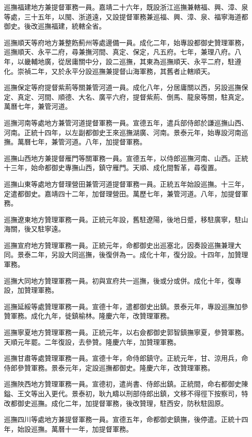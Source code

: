 巡撫福建地方兼提督軍務一員。嘉靖二十六年，既設浙江巡撫兼轄福、興、漳、泉等處，三十五年，以閩、浙道遠，又設提督軍務兼巡福、興、漳、泉、福寧海道都御史。後改巡撫福建，統轄全省。

巡撫順天等府地方兼整飭薊州等處邊備一員。成化二年，始專設都御史贊理軍務，巡撫順天、永平二府，尋兼撫河間、真定、保定，凡五府。七年，兼理八府。八年，以畿輔地廣，從居庸關中分，設二巡撫，其東為巡撫順天、永平二府，駐遵化。崇禎二年，又於永平分設巡撫兼提督山海軍務，其舊者止轄順天。

巡撫保定等府提督紫荊等關兼管河道一員。成化八年，分居庸關以西，另設巡撫保定、真定、河間、順德、大名、廣平六府，提督紫荊、倒馬、龍泉等關，駐真定。萬曆七年，兼管河道。

巡撫河南等處地方兼管河道提督軍務一員。宣德五年，遣兵部侍郎於謙巡撫山西、河南。正統十四年，以左副都御史王來巡撫湖廣、河南。景泰元年，始專設河南巡撫。萬曆七年，兼管河道。八年，加提督軍務。

巡撫山西地方兼提督雁門等關軍務一員。宣德五年，以侍郎巡撫河南、山西。正統十三年，始命都御史專撫山西，鎮守雁門。天順、成化間暫革，尋復置。

巡撫山東等處地方督理營田兼管河道提督軍務一員。正統五年始設巡撫。十三年，定遣都御史。嘉靖四十二年，加督理營田。萬歷七年，兼管河道。八年，加提督軍務。

巡撫遼東地方贊理軍務一員。正統元年設，舊駐遼陽，後地日蹙，移駐廣寧，駐山海關，後又駐寧遠。

巡撫宣府地方贊理軍務一員。正統元年，命都御史出巡塞北，因奏設巡撫兼理大同。景泰二年，另設大同巡撫，後復併為一。成化十年，復分設。十四年，加贊理軍務。

巡撫大同地方贊理軍務一員。初與宣府共一巡撫，後或分或併。成化十年，復專設，加贊理軍務。

巡撫延綏等處贊理軍務一員。宣德十年，遣都御史出鎮。景泰元年，專設巡撫加參贊軍務。成化九年，徙鎮榆林。隆慶六年，改贊理軍務。

巡撫寧夏地方贊理軍務一員。正統元年，以右僉都御史郭智鎮撫寧夏，參贊軍務。天順元年罷。二年復設，去參贊。隆慶六年，加贊理軍務。

巡撫甘肅等處贊理軍務一員。宣德十年，命侍郎鎮守。正統元年，甘、涼用兵，命侍郎參贊軍務。景泰元年，定設巡撫都御史。隆慶六年，改贊理軍務。

巡撫陜西地方贊理軍務一員。宣德初，遣尚書、侍郎出鎮。正統間，命右都御史陳鎰、王文等出入更代。景泰初，耿九疇以刑部侍郎出鎮，文移不得徑下按察司，特改都御史巡撫。成化二年，加提督軍務，後改贊理，駐西安，防秋駐固原。

巡撫四川等處地方兼提督軍務一員。宣德五年，命都御史鎮撫，後停遣。正統十四年，始設巡撫。萬曆十一年，加提督軍務。

